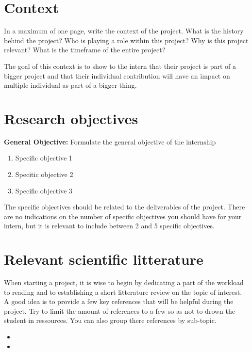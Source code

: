 \documentclass[12pt]{article}
\begin{document}
\pagestyle{fancy}


\section{Context}

In a maximum of one page, write the context of the project. What is the history behind the project? Who is playing a role within this project? Why is this project relevant? What is the timeframe of the entire project?

The goal of this context is to show to the intern that their project is part of a bigger project and that their individual contribution will have an impact on multiple individual as part of a bigger thing.


\section{Research objectives}

\textbf{General Objective:} Formulate the general objective of the internship

\begin{enumerate}
  \item Specific objective 1
  \item Specitic objective 2
  \item Specific objective 3
\end{enumerate}

The specific objectives should be related to the deliverables of the project. There are no indications on the number of specific objectives you should have for your intern, but it is relevant to include between 2 and 5 specific objectives. 


\section{Relevant scientific litterature}

When starting a project, it is wise to begin by dedicating a part of the workload to reading and to establishing a short litterature review on the topic of interest. A good idea is to provide a few key references that will be helpful during the project. Try to limit the amount of references to a few so as not to drown the student in ressources. You can also group there references by sub-topic.  

\begin{itemize}
  \item  {} 
  \item  {}
\end{itemize}
\end{document}
